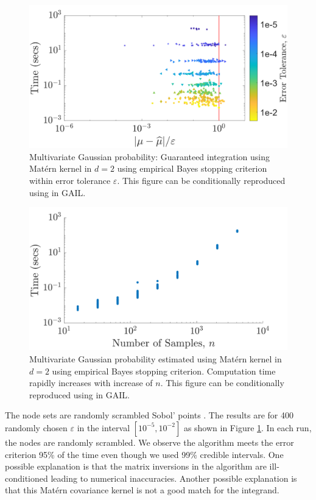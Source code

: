 \begin{figure}[ht]
	\centering
	\includegraphics[width=0.9\linewidth]{BayesCub/figures/MVN_guaranteed_time_Matern_d2_2019-Jun-29}
	\caption{Multivariate Gaussian probability: Guaranteed integration using Mat\'ern kernel in $d=2$ using empirical Bayes stopping criterion within error tolerance $\varepsilon$. This figure can be conditionally reproduced using  in GAIL.}
	\label{fig:MVN_Metern_d2b2}
\end{figure}
\begin{figure}[ht]
	\centering
	\includegraphics[width=0.9\linewidth]{BayesCub/figures/MVN_rapid_n_vs_time_Matern_d2_2019-Jun-29}
	\caption{Multivariate Gaussian probability estimated using Mat\'ern kernel in $d=2$ using empirical Bayes stopping criterion. Computation time rapidly increases with increase of $n$. This figure can be conditionally reproduced using  in GAIL.}
	\label{fig:MVN_Metern_d2b2_time_growth}
\end{figure}
The node sets are randomly scrambled Sobol' points \cite{DicEtal14a,DicPil10a}.  The results are for 400 randomly chosen $\varepsilon$ in the interval $[10^{-5}, 10^{-2}]$ as shown in Figure \ref{fig:MVN_Metern_d2b2}. In each run, the nodes are randomly scrambled.  We  observe the algorithm meets the error criterion 95\% of the time even though we used 99\% credible intervals.
One possible explanation is that the matrix inversions in the algorithm are ill-conditioned leading to numerical inaccuracies.  Another possible explanation is that this Mat\'ern covariance kernel is not a good match for the integrand.

